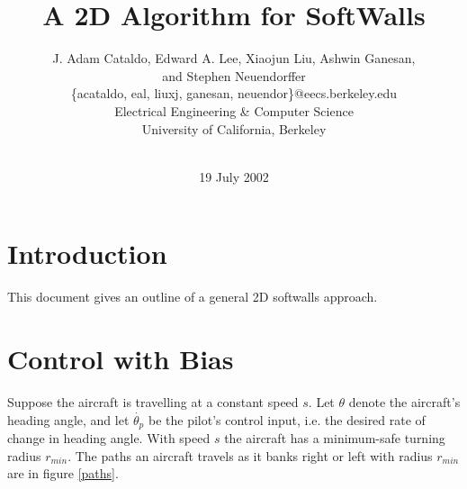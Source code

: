 \documentclass[11pt]{article}
\begin{document}


\title{A 2D Algorithm for SoftWalls}

\author{J. Adam Cataldo, Edward A. Lee, Xiaojun Liu, Ashwin Ganesan,\\
and Stephen Neuendorffer\\ 
\{acataldo, eal, liuxj, ganesan, neuendor\}@eecs.berkeley.edu\\
Electrical Engineering \& Computer Science\\ 
University of California, Berkeley\\ 
\\}

\date{19 July 2002}
\maketitle


\section{Introduction}

This document gives an outline of a general 2D softwalls approach.



\section{Control with Bias}


Suppose the aircraft is travelling at a constant speed $s$.  Let
$\theta$ denote the aircraft's heading angle, and let
$\dot{\theta_{p}}$ be the pilot's control input, i.e. the desired rate
of change in heading angle.  With speed $s$ the aircraft has a
minimum-safe turning radius $r_{min}$.  The paths an aircraft travels
as it banks right or left with radius $r_{min}$ are in figure \ref{paths}.
\end{document}
